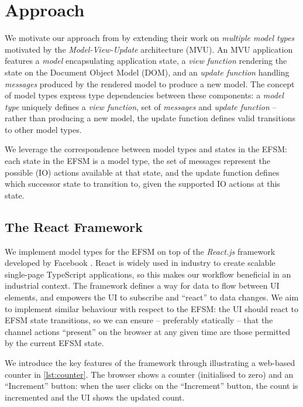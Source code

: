 \section{Approach}
We motivate our approach from \cite{MVU2020} by extending
their work on \textit{multiple model types} motivated by the
\textit{Model-View-Update} architecture (MVU).
An MVU application features a \textit{model} encapsulating application
state, a \textit{view function} rendering the state on the 
Document Object Model (DOM), and an
\textit{update function} handling \textit{messages} produced by the
rendered model to produce a new model.
The concept of model types express type dependencies between these
components: a \emph{model type} uniquely defines a \textit{view function},
set of \textit{messages} and \textit{update function} -- rather than
producing a new model, the update function defines valid transitions to
other model types.

We leverage the correspondence between model types and states in the EFSM:
each state in the EFSM is a model type, the set of messages represent
the possible (IO) actions available at that state,
and the update function defines which successor state to transition to,
given the supported IO actions at this state.

\subsection{The React Framework}
We implement model types for the EFSM on top of the 
\emph{React.js} framework developed by Facebook \cite{React}.
React is widely used in industry to create scalable single-page
TypeScript applications, so this makes our workflow beneficial in an
industrial context. 
The framework defines a way for data to flow
between UI elements, and empowers the UI to subscribe and
``react'' to data changes.
We aim to implement similar behaviour with respect to the EFSM:
the UI should react to EFSM state transitions,
so we can ensure -- preferably statically -- that the
channel actions ``present'' on the browser at any given time
are those permitted by the current EFSM state.

We introduce the key features of the framework
through illustrating a web-based counter in \cref{lst:counter}.
The browser shows a counter (initialised to zero) 
and an ``Increment'' button:
when the user clicks on the ``Increment'' button,
the count is incremented and the UI shows the updated count.

